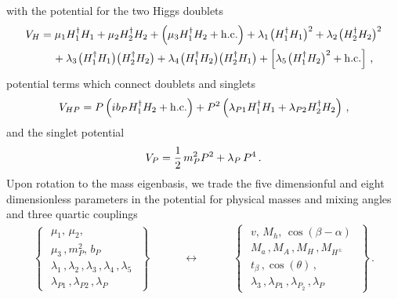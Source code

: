 with the potential for the two Higgs doublets
\begin{align}\label{eq:VH}
V_{H} & = \mu_1 H_1^\dagger H_1 + \mu_2 H_2^\dagger H_2 + \left ( \mu_3  H_1^\dagger H_2 + {\rm h.c.} \right ) + \lambda_1  \hspace{0.25mm} \big ( H_1^\dagger H_1  \big )^2  + \lambda_2  \hspace{0.25mm} \big ( H_2^\dagger H_2 \big  )^2 \notag \\
& \phantom{xx} +  \lambda_3 \hspace{0.25mm} \big ( H_1^\dagger H_1  \big ) \big ( H_2^\dagger H_2  \big ) + \lambda_4  \hspace{0.25mm} \big ( H_1^\dagger H_2  \big ) \big ( H_2^\dagger H_1  \big ) + \left [ \lambda_5   \hspace{0.25mm} \big ( H_1^\dagger H_2 \big )^2 + {\rm h.c.} \right ]  \,,
\end{align}
potential terms which connect doublets and singlets 
\begin{equation} \label{eq:VHP}
\begin{split}
V_{HP}  = P \left ( i \hspace{0.1mm} b_P  \hspace{0.1mm}  H_1^\dagger H_2 + {\rm h.c.} \right ) + P^2 \left (  \lambda_{P1}  \hspace{0.1mm}  H_1^\dagger H_1 +   \lambda_{P2}  \hspace{0.1mm}  H_2^\dagger H_2 \right )  \,,
\end{split} 
\end{equation}
and the singlet potential
\begin{equation} \label{eq:VP}
V_{P}  =  \frac{1}{2} \hspace{0.5mm} m_P^2  P^2 +  \lambda_P\,P^4 \,.
\end{equation}
Upon rotation to the mass eigenbasis, we trade the five dimensionful and eight dimensionless parameters in the potential  for physical masses and mixing angles and three quartic couplings
\begin{align}
\left\{ \,\,\begin{matrix}
\mu_1,\,\mu_2,\\[3pt]
\mu_3\,, m_P^2,\, b_P\\[3pt]
\lambda_1\,,\lambda_2\,,\lambda_3\,,\lambda_4\,,\lambda_5\\
\lambda_{P1}\,,\lambda_{P2} \,, \lambda_P
\end{matrix}\,\,\right\}\qquad \quad \longleftrightarrow \quad \qquad \left\{ \,\,\begin{matrix}
v,\, M_h,\,\cos(\beta-\alpha)\\[3pt]
M_a\,, M_A\,, M_H\,,M_{H^\pm}\\[3pt]
t_\beta\,, \cos(\theta)\,, \\[3pt]
\lambda_3\,,\lambda_{P1}\,,\lambda_{P_2}\,,\lambda_P
\end{matrix}\,\,\right\}\,.
\end{align}
